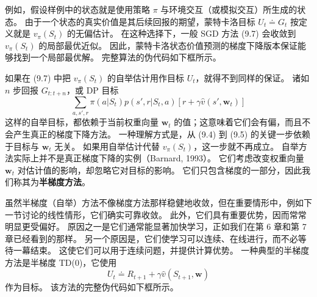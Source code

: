 \documentclass[UTF8,12pt,a4paper,fontset=fandol]{ctexart}
\begin{document}
例如，假设样例中的状态就是使用策略 $\pi$ 与环境交互（或模拟交互）所生成的状态。
由于一个状态的真实价值是其后续回报的期望，蒙特卡洛目标 $U_t\doteq G_t$ 按定义就是 $v_\pi(S_t)$ 的无偏估计。
在这种选择下，一般 SGD 方法 (9.7) 会收敛到 $v_\pi(S_t)$ 的局部最优近似。
因此，蒙特卡洛状态价值预测的梯度下降版本保证能够找到一个局部最优解。
完整算法的伪代码如下框所示。

\begin{center}
\end{center}

如果在 (9.7) 中把 $v_\pi(S_t)$ 的自举估计用作目标 $U_t$，就得不到同样的保证。
诸如 $n$ 步回报 $G_{t:t+n}$，或 DP 目标
\[
\sum_{a,s',r}\pi(a|S_t)p(s',r|S_t,a)\left[r+\gamma\hat{v}(s',\mathbf{w}_t)\right]
\]
这样的自举目标，都依赖于当前权重向量 $\mathbf{w}_t$ 的值；这意味着它们会有偏，而且不会产生真正的梯度下降方法。
一种理解方式是，从 (9.4) 到 (9.5) 的关键一步依赖于目标与 $\mathbf{w}_t$ 无关。
如果用自举估计代替 $v_\pi(S_t)$，这一步就不再成立。
自举方法实际上并不是真正梯度下降的实例（Barnard, 1993）。
它们考虑改变权重向量 $\mathbf{w}_t$ 对估计值的影响，却忽略它对目标的影响。
它们只包含梯度的一部分，因此我们称其为\textbf{半梯度方法}。

虽然半梯度（自举）方法不像梯度方法那样稳健地收敛，但在重要情形中，例如下一节讨论的线性情形，它们确实可靠收敛。
此外，它们具有重要优势，因而常常明显更受偏好。
原因之一是它们通常能显著加快学习，正如我们在第 6 章和第 7 章已经看到的那样。
另一个原因是，它们使学习可以连续、在线进行，而不必等待一幕结束。
这使它们可以用于连续问题，并提供计算优势。
一种典型的半梯度方法是半梯度 TD(0)，它使用
\[
U_t\doteq R_{t+1}+\gamma\hat{v}(S_{t+1},\mathbf{w})
\]
作为目标。
该方法的完整伪代码如下框所示。
\end{document}
